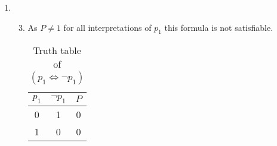 \documentclass{article}
\begin{document}
\begin{enumerate}
{                }
        \item{
                \begin{enumerate}\setcounter{enumii}{2}
                        \item{
                                                As $P\neq1$ for all interpretations of $p_1$ this formula is not satisfiable. 
 \begin{table}[H]
                                                        \centering
                                                        \begin{tabular}{|c|c|c|}
                                                                \hline
                                                                $p_1$ & $\neg p_1$ & $P$\\
                                                                \hline\hline
                                                                0 & 1 & 0\\
                                                                \hline
                                                                1 & 0 & 0\\
                                                                \hline
                                                        \end{tabular}
                                                        \caption{Truth table of $(p_1\Leftrightarrow\neg p_1)$}
                                                \end{table}
                                        }
                \end{enumerate}
                }
\end{enumerate}
\end{document}
